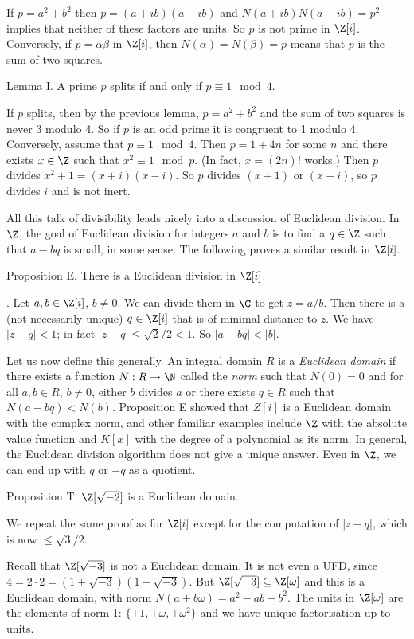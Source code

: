 \proof If $p = a^2 + b^2$ then $p = (a + ib)(a-ib)$ and $N(a+ib)N(a-ib) = p^2$ implies that neither of these factors are units. So $p$ is not prime in $\Z[i]$. Conversely, if $p = \alpha\beta$ in $\Z[i]$, then $N(\alpha) = N(\beta) = p$ means that $p$ is the sum of two squares.\slug

\proclaim Lemma I. A prime $p$ splits if and only if $p\equiv 1 \mod 4$.

\proof If $p$ splits, then by the previous lemma, $p = a^2 + b^2$ and the sum of two squares is never $3$ modulo 4. So if $p$ is an odd prime it is congruent to 1 modulo 4. Conversely, assume that $p\equiv 1\mod 4$. Then $p = 1 + 4n$ for some $n$ and there exists $x\in \Z$ such that $x^2 \equiv 1\mod p$. (In fact, $x = (2n)!$ works.) Then $p$ divides $x^2 + 1 = (x+i)(x-i)$. So $p$ divides $(x+1)$ or $(x-i)$, so $p$ divides $i$ and is not inert.\slug

All this talk of divisibility leads nicely into a discussion of Euclidean division. In $\Z$, the goal of Euclidean division for integers $a$ and $b$ is to find a $q\in \Z$ such that $a-bq$ is small, in some sense. The following proves a similar result in $\Z[i]$.

\proclaim Proposition E. There is a Euclidean division in $\Z[i]$.

\proof. Let $a,b\in \Z[i]$, $b\neq 0$. We can divide them in $\C$ to get $z = a/b$. Then there is a (not necessarily unique) $q\in \Z[i]$ that is of minimal distance to $z$. We have $|z-q|<1$; in fact $|z-q| \leq \sqrt{2}/2 < 1$. So $|a-bq| < |b|$.\slug

Let us now define this generally. An integral domain $R$ is a {\it Euclidean domain} if there exists a function $N : R\to \N$ called the {\it norm} such that $N(0) = 0$ and for all $a,b\in R$, $b\neq 0$, either $b$ divides $a$ or there exists $q\in R$ such that $N(a-bq) < N(b)$. Proposition E showed that $Z[i]$ is a Euclidean domain with the complex norm, and other familiar examples include $\Z$ with the absolute value function and $K[x]$ with the degree of a polynomial as its norm. In general, the Euclidean division algorithm does not give a unique answer. Even in $\Z$, we can end up with $q$ or $-q$ as a quotient.

\proclaim Proposition T. $\Z[\sqrt{-2}]$ is a Euclidean domain.

\proof We repeat the same proof as for $\Z[i]$ except for the computation of $|z-q|$, which is now $\leq \sqrt{3}/2$.\slug

Recall that $\Z[\sqrt{-3}]$ is not a Euclidean domain. It is not even a UFD, since $4 = 2\cdot 2 = (1+\sqrt{-3})(1-\sqrt{-3})$. But $\Z[\sqrt{-3}]\subseteq \Z[\omega]$ and this is a Euclidean domain, with norm $N(a+b\omega) = a^2 - ab + b^2$. The units in $\Z[\omega]$ are the elements of norm 1: $\{\pm 1, \pm \omega, \pm \omega^2\}$ and we have unique factorisation up to units.

